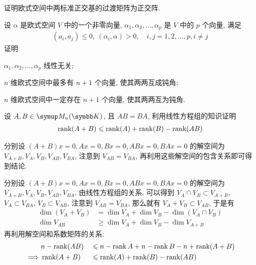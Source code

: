 \documentclass{ctexart}
\begin{document}
\begin{exercise}[series=exer]
    \item 证明欧式空间中两标准正交基的过渡矩阵为正交阵.
    \item 设 $ \alpha $ 是欧式空间 $ V $ 中的一个非零向量, $ \alpha_{1}, \alpha_{2}, \dots, \alpha_{p} $ 是 $ V $ 中的 $ p $ 个向量, 满足
    \begin{align*}
        (a_{i}, a_{j}) \le 0,\ (\alpha_{i}, \alpha) > 0, \quad i, j = 1, 2, \dots, p, i \ne j
    \end{align*}
    证明
    \begin{exercise}
        \item $ \alpha_{1}, \alpha_{2}, \dots, \alpha_{p} $ 线性无关;
        \item $ n $ 维欧式空间中最多有 $ n + 1 $ 个向量, 使其两两互成钝角;
        \item $ n $ 维欧式空间中一定存在 $ n + 1 $ 个向量, 使其两两互为钝角.
    \end{exercise}
    \item 设 $ A, B \in \MM[\K] $, 且 $ AB = BA $, 利用线性方程组的知识证明
    \begin{align*}
        \rank(A + B) \leqslant \rank(A) + \rank(B) - \rank(AB)
    \end{align*}
    \begin{hint}
        分别设 $ (A + B)x = 0, Ax = 0, Bx = 0, ABx = 0, BAx = 0 $ 的解空间为 $ V_{A+B}, V_{A}, V_{B}, V_{AB}, V_{BA} $, 注意到 $ V_{AB} = V_{BA} $, 再利用这些解空间的包含关系即可得到结论.
    \end{hint}
    \begin{answer}
        分别设 $ (A + B)x = 0, Ax = 0, Bx = 0, ABx = 0, BAx = 0 $ 的解空间为 $ V_{A+B}, V_{A}, V_{B}, V_{AB}, V_{BA} $, 由线性方程组的关系, 可以得到 $ V_{A} \cap V_{B} \subset V_{A + B} $, $ V_{A} \subset V_{BA}  $, $ V_{B} \subset V_{AB} $, 注意到 $ V_{AB} = V_{BA} $, 那么就有 $ V_{A} + V_{B} \subset V_{AB} $, 于是有
        \begin{align*}
            \dim(V_{A} + V_{B}) & = \dim V_{A} + \dim V_{B} - \dim(V_{A} \cap V_{B})\\
            \dim V_{AB} & \ge  \dim V_{A} + \dim V_{B} - \dim V_{A + B}
        \end{align*}
        再利用解空间和系数矩阵的关系:
        \begin{alignat*}{2}
            & n - \rank (AB) && \leqslant  n - \rank A + n - \rank B - n + \rank (A + B) \\
            \implies & \rank(A + B) && \leqslant \rank(A) + \rank(B) - \rank(AB)
        \end{alignat*}

\end{answer}
\end{exercise}
\end{document}
